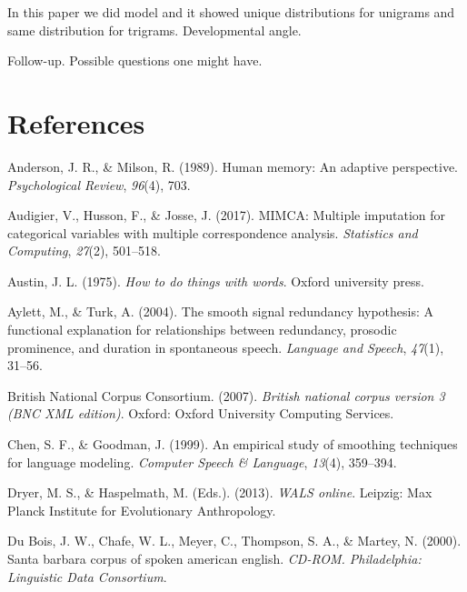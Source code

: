 \documentclass[10pt, letterpaper]{article}
\begin{document}
In this paper we did model and it showed unique distributions for
unigrams and same distribution for trigrams. Developmental angle.

Follow-up. Possible questions one might have.

\hypertarget{references}{%
\section{References}\label{references}}

\setlength{\parindent}{-0.1in} 
\setlength{\leftskip}{0.125in}

\noindent

\hypertarget{refs}{}
\leavevmode\hypertarget{ref-anderson1989}{}%
Anderson, J. R., \& Milson, R. (1989). Human memory: An adaptive
perspective. \emph{Psychological Review}, \emph{96}(4), 703.

\leavevmode\hypertarget{ref-audigier2017}{}%
Audigier, V., Husson, F., \& Josse, J. (2017). MIMCA: Multiple
imputation for categorical variables with multiple correspondence
analysis. \emph{Statistics and Computing}, \emph{27}(2), 501--518.

\leavevmode\hypertarget{ref-austin1975}{}%
Austin, J. L. (1975). \emph{How to do things with words}. Oxford
university press.

\leavevmode\hypertarget{ref-aylett2004}{}%
Aylett, M., \& Turk, A. (2004). The smooth signal redundancy hypothesis:
A functional explanation for relationships between redundancy, prosodic
prominence, and duration in spontaneous speech. \emph{Language and
Speech}, \emph{47}(1), 31--56.

\leavevmode\hypertarget{ref-british-national-corpus-consortium2007}{}%
British National Corpus Consortium. (2007). \emph{British national
corpus version 3 (BNC XML edition)}. Oxford: Oxford University Computing
Services.

\leavevmode\hypertarget{ref-chen1999}{}%
Chen, S. F., \& Goodman, J. (1999). An empirical study of smoothing
techniques for language modeling. \emph{Computer Speech \& Language},
\emph{13}(4), 359--394.

\leavevmode\hypertarget{ref-2013}{}%
Dryer, M. S., \& Haspelmath, M. (Eds.). (2013). \emph{WALS online}.
Leipzig: Max Planck Institute for Evolutionary Anthropology.

\leavevmode\hypertarget{ref-sbc}{}%
Du Bois, J. W., Chafe, W. L., Meyer, C., Thompson, S. A., \& Martey, N.
(2000). Santa barbara corpus of spoken american english. \emph{CD-ROM.
Philadelphia: Linguistic Data Consortium}.
\end{document}
